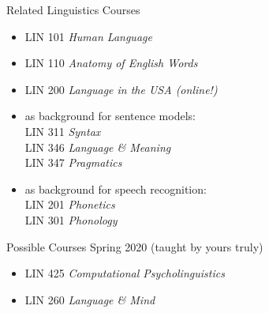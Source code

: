 \documentclass[xcolor={usenames,svgnames,x11names,dvipsnames,table}]{beamer}
\begin{document}
\begin{frame}{Related Linguistics Courses}
    \begin{itemize}
        \item LIN 101 \emph{Human Language}\\
        \item LIN 110 \emph{Anatomy of English Words}\\
        \item LIN 200 \emph{Language in the USA (online!)}\\
        \item as background for sentence models:\\
            LIN 311 \emph{Syntax}\\
            LIN 346 \emph{Language \& Meaning}\\
             LIN 347 \emph{Pragmatics}\\
        \item as background for speech recognition:\\
            LIN 201 \emph{Phonetics}\\
            LIN 301 \emph{Phonology}
    \end{itemize}

    \pause
    \begin{block}{Possible Courses Spring 2020 (taught by yours truly)}
        \begin{itemize}
            \item LIN 425 \emph{Computational Psycholinguistics}
            \item LIN 260  \emph{Language \& Mind}
        \end{itemize}
    \end{block}
\end{frame}
\end{document}
